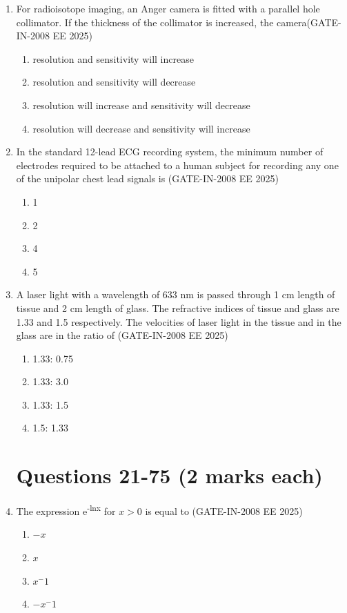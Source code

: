 \documentclass[journal,12pt,onecolumn]{IEEEtran}
\theoremstyle{remark}
\begin{document}
\begin{enumerate}[label=Q.\arabic*,start=1]
    \item For radioisotope imaging, an Anger camera is fitted with a parallel hole collimator. If the thickness
of the collimator is increased, the camera(GATE-IN-2008 EE 2025)
    \begin{enumerate} 
        \item  resolution and sensitivity will increase
        \item  resolution and sensitivity will decrease
        \item  resolution will increase and sensitivity will decrease
        \item  resolution will decrease and sensitivity will increase
    \end{enumerate}
    
    \item In the standard 12-lead ECG recording system, the minimum number of electrodes required to be
attached to a human subject for recording any one of the unipolar chest lead signals is (GATE-IN-2008 EE 2025)
    \begin{enumerate} 
        \item 1  
        \item 2
        \item 4
        \item 5
    \end{enumerate}
    
    \item A laser light with a wavelength of 633 nm is passed through 1 cm length of tissue and 2 cm length
of glass. The refractive indices of tissue and glass are 1.33 and 1.5 respectively. The velocities of
laser light in the tissue and in the glass are in the ratio of (GATE-IN-2008 EE 2025)

    \begin{enumerate} 
        \item 1.33: 0.75
        \item 1.33: 3.0
        \item 1.33: 1.5
        \item 1.5: 1.33
    \end{enumerate}

\section*{Questions 21-75 (2 marks each)}
    \item The expression e\textsuperscript{-lnx} for $x > 0$ is equal to (GATE-IN-2008 EE 2025)
    \begin{enumerate} 
        \item $-x$ 
        \item $x$
        \item $x^-1$ 
        \item $-x^-1$
    \end{enumerate}
    

\end{enumerate}
\end{document}
